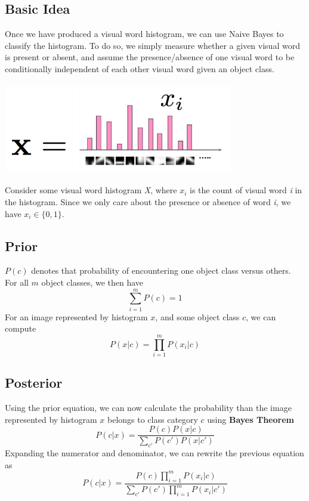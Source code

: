 \documentclass{article}
\begin{document}
\subsection{Basic Idea}
Once we have produced a visual word histogram, we can use Naive Bayes to classify the histogram. To do so, we simply measure whether a given visual word is present or absent, and assume the presence/absence of one visual word to be conditionally independent of each other visual word given an object class. 
\begin{center}
\includegraphics[width=10cm,height=4cm]{Bayes_Histogram}
\end{center}

Consider some visual word histogram \textit{X}, where $x_i$ is the count of visual word \textit{i} in the histogram. Since we only care about the presence or absence of word \textit{i}, we have $x_i \in \{0,1\}$.  
\subsection{Prior}
$P(c)$ denotes that probability of encountering one object class versus others. For all $m$ object classes, we then have $$\sum_{i=1}^m P(c)=1$$ For an image represented by histogram $x$, and some object class $c$, we can compute $$P(x|c) = \prod_{i=1}^m P(x_i|c)$$
\subsection{Posterior}
Using the prior equation, we can now calculate the probability than the image represented by histogram $x$ belongs to class category $c$ using \textbf{Bayes Theorem} $$P(c|x) = \frac{P(c)P(x|c)}{\sum_{c'}P(c')P(x|c')}$$
Expanding the numerator and denominator, we can rewrite the previous equation as 
$$P(c|x) = \frac{P(c)\prod_{i=1}^mP(x_i|c)}{\sum_{c'}P(c')\prod_{i=1}^mP(x_i|c')}$$
\end{document}
